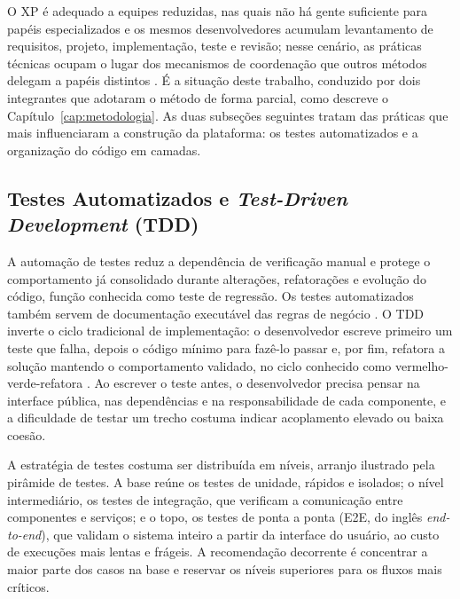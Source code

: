 O XP é adequado a equipes reduzidas, nas quais não há gente suficiente para papéis especializados e os mesmos desenvolvedores acumulam levantamento de requisitos, projeto, implementação, teste e revisão; nesse cenário, as práticas técnicas ocupam o lugar dos mecanismos de coordenação que outros métodos delegam a papéis distintos \cite{wildt2015}. É a situação deste trabalho, conduzido por dois integrantes que adotaram o método de forma parcial, como descreve o Capítulo~\ref{cap:metodologia}. As duas subseções seguintes tratam das práticas que mais influenciaram a construção da plataforma: os testes automatizados e a organização do código em camadas.

\subsection{Testes Automatizados e \textit{Test-Driven Development} (TDD)}
\label{subsec:testes-tdd}

A automação de testes reduz a dependência de verificação manual e protege o comportamento já consolidado durante alterações, refatorações e evolução do código, função conhecida como teste de regressão. Os testes automatizados também servem de documentação executável das regras de negócio \cite{aniche2012,silveira2012}. O TDD inverte o ciclo tradicional de implementação: o desenvolvedor escreve primeiro um teste que falha, depois o código mínimo para fazê-lo passar e, por fim, refatora a solução mantendo o comportamento validado, no ciclo conhecido como vermelho-verde-refatora \cite{martin_coder}. Ao escrever o teste antes, o desenvolvedor precisa pensar na interface pública, nas dependências e na responsabilidade de cada componente, e a dificuldade de testar um trecho costuma indicar acoplamento elevado ou baixa coesão.

A estratégia de testes costuma ser distribuída em níveis, arranjo ilustrado pela pirâmide de testes. A base reúne os testes de unidade, rápidos e isolados; o nível intermediário, os testes de integração, que verificam a comunicação entre componentes e serviços; e o topo, os testes de ponta a ponta (E2E, do inglês \textit{end-to-end}), que validam o sistema inteiro a partir da interface do usuário, ao custo de execuções mais lentas e frágeis. A recomendação decorrente é concentrar a maior parte dos casos na base e reservar os níveis superiores para os fluxos mais críticos.

